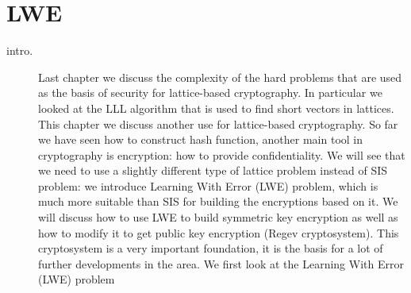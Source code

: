 \section{LWE}
\label{sub:LWE}
    \begin{description}
        \item[intro.] Last chapter we discuss the complexity of the hard
            problems that are used as the basis of security for lattice-based
            cryptography. In particular we looked at the LLL algorithm that is
            used to find short vectors in lattices. This chapter we discuss
            another use for lattice-based cryptography. So far we have seen how
            to construct hash function, another main tool in cryptography is
            encryption: how to provide confidentiality. We will see that we need
            to use a slightly different type of lattice problem instead of SIS
            problem: we introduce Learning With Error (LWE) problem, which is
            much more suitable than SIS for building the encryptions based on
            it. We will discuss how to use LWE to build symmetric key encryption
            as well as how to modify it to get public key encryption (Regev
            cryptosystem). This cryptosystem is a very important foundation, it
            is the basis for a lot of further
            developments in the area. We first look at the Learning With Error
            (LWE) problem


\end{description}
